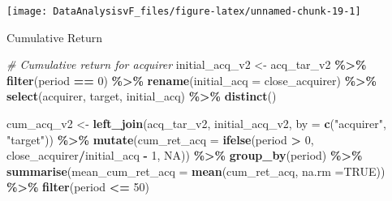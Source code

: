 \documentclass[
]{article}
\newenvironment{Shaded}{\begin{snugshade}}{\end{snugshade}}
\newcommand{\CommentTok}[1]{\textcolor[rgb]{0.56,0.35,0.01}{\textit{#1}}}
\newcommand{\DataTypeTok}[1]{\textcolor[rgb]{0.13,0.29,0.53}{#1}}
\newcommand{\DecValTok}[1]{\textcolor[rgb]{0.00,0.00,0.81}{#1}}
\newcommand{\KeywordTok}[1]{\textcolor[rgb]{0.13,0.29,0.53}{\textbf{#1}}}
\newcommand{\NormalTok}[1]{#1}
\newcommand{\OperatorTok}[1]{\textcolor[rgb]{0.81,0.36,0.00}{\textbf{#1}}}
\newcommand{\OtherTok}[1]{\textcolor[rgb]{0.56,0.35,0.01}{#1}}
\newcommand{\StringTok}[1]{\textcolor[rgb]{0.31,0.60,0.02}{#1}}
\begin{document}
\begin{center}\texttt{[image: DataAnalysisvF\_files/figure-latex/unnamed-chunk-19-1]} \end{center}

Cumulative Return

\begin{Shaded}
\begin{Highlighting}[]
\CommentTok{\# Cumulative return for acquirer}
\NormalTok{initial\_acq\_v2 \textless{}{-}}\StringTok{ }\NormalTok{acq\_tar\_v2 }\OperatorTok{\%\textgreater{}\%}
\StringTok{  }\KeywordTok{filter}\NormalTok{(period }\OperatorTok{==}\StringTok{ }\DecValTok{0}\NormalTok{) }\OperatorTok{\%\textgreater{}\%}
\StringTok{  }\KeywordTok{rename}\NormalTok{(}\DataTypeTok{initial\_acq =}\NormalTok{ close\_acquirer) }\OperatorTok{\%\textgreater{}\%}
\StringTok{  }\KeywordTok{select}\NormalTok{(acquirer, target, initial\_acq) }\OperatorTok{\%\textgreater{}\%}
\StringTok{  }\KeywordTok{distinct}\NormalTok{()}

\NormalTok{cum\_acq\_v2 \textless{}{-}}\StringTok{ }\KeywordTok{left\_join}\NormalTok{(acq\_tar\_v2, initial\_acq\_v2, }\DataTypeTok{by =} \KeywordTok{c}\NormalTok{(}\StringTok{"acquirer"}\NormalTok{, }\StringTok{"target"}\NormalTok{)) }\OperatorTok{\%\textgreater{}\%}
\StringTok{  }\KeywordTok{mutate}\NormalTok{(}\DataTypeTok{cum\_ret\_acq =} \KeywordTok{ifelse}\NormalTok{(period }\OperatorTok{\textgreater{}}\StringTok{ }\DecValTok{0}\NormalTok{, close\_acquirer}\OperatorTok{/}\NormalTok{initial\_acq }\OperatorTok{{-}}\StringTok{ }\DecValTok{1}\NormalTok{, }\OtherTok{NA}\NormalTok{)) }\OperatorTok{\%\textgreater{}\%}
\StringTok{  }\KeywordTok{group\_by}\NormalTok{(period) }\OperatorTok{\%\textgreater{}\%}
\StringTok{  }\KeywordTok{summarise}\NormalTok{(}\DataTypeTok{mean\_cum\_ret\_acq =} \KeywordTok{mean}\NormalTok{(cum\_ret\_acq, }\DataTypeTok{na.rm =}\OtherTok{TRUE}\NormalTok{)) }\OperatorTok{\%\textgreater{}\%}
\StringTok{  }\KeywordTok{filter}\NormalTok{(period }\OperatorTok{\textless{}=}\StringTok{ }\DecValTok{50}\NormalTok{)}
\end{Highlighting}
\end{Shaded}
\end{document}
